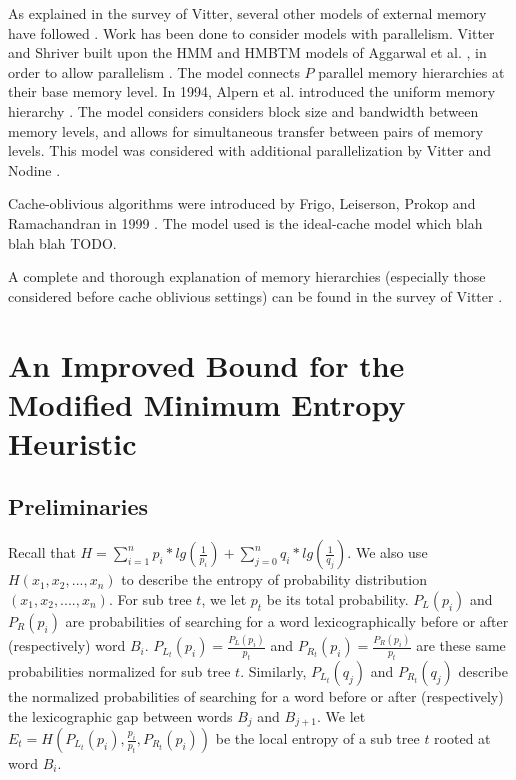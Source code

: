 \documentclass[letterpaper,12pt,titlepage,oneside,final]{book}
\theoremstyle{plain}
\begin{document}
As explained in the survey of Vitter, several other models of external memory have followed \cite{vitter2001external}. Work has been done to consider models with parallelism. Vitter and Shriver built upon the HMM and HMBTM models of Aggarwal et al. \cite{aggarwal1987model}, \cite{aggarwal1987hierarchical} in order to allow parallelism \cite{vitter1994algorithms}. The model connects $P$ parallel memory hierarchies at their base memory level. In 1994, Alpern et al. introduced the uniform memory hierarchy \cite{alpern1994uniform}. The model considers considers block size and bandwidth between memory levels, and allows for simultaneous transfer between pairs of memory levels. This model was considered with additional parallelization by Vitter and Nodine \cite{vitter1993large}.


Cache-oblivious algorithms were introduced by Frigo, Leiserson, Prokop and Ramachandran in 1999 \cite{frigo1999cache}. The model used is the ideal-cache model which blah blah blah TODO.

A complete and thorough explanation of memory hierarchies (especially those considered before cache oblivious settings) can be found in the survey of Vitter \cite{vitter2001external}.



\chapter{An Improved Bound for the Modified Minimum Entropy Heuristic}\label{An Improved Bound for the Modified Minimum Entropy Heuristic}

\section{Preliminaries}

Recall that $H = \sum_{i=1}^{n} p_i*lg(\frac{1}{p_i}) + \sum_{j=0}^{n} q_i*lg(\frac{1}{q_j})$. We also use $H(x_1,x_2,...,x_n)$ to describe the entropy of probability distribution $(x_1, x_2, ...., x_n)$. For sub tree $t$, we let $p_t$ be its total probability. $P_{L}(p_i)$ and $P_{R}(p_i)$ are probabilities of searching for a word lexicographically before or after (respectively) word $B_i$. $P_{L_t}(p_i)=\frac{P_L(p_i)}{p_t}$ and $P_{R_t}(p_i)=\frac{P_R(p_i)}{p_t}$ are these same probabilities normalized for sub tree $t$. Similarly, $P_{L_t}(q_j)$ and $P_{R_t}(q_j)$ describe the normalized probabilities of searching for a word before or after (respectively) the lexicographic gap between words $B_j$ and $B_{j+1}$. We let $E_t=H(P_{L_t}(p_i), \frac{p_i}{p_t}, P_{R_t}(p_i))$ be the local entropy of a sub tree $t$ rooted at word $B_i$.  
\end{document}
